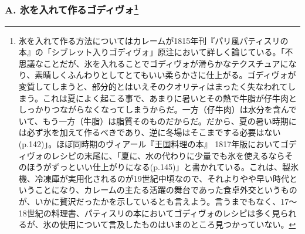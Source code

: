  
\begin{recette}
\hypertarget{godiveau-mouille-a-la-glace}{%
\subsubsection[A. 氷を入れて作るゴディヴォ]{\texorpdfstring{A.
氷を入れて作るゴディヴォ\footnote{氷を入れて作る方法についてはカレームが1815年刊『パリ風パティスリの本』の「シブレット入りゴディヴォ」原注において詳しく論じている。「不思議なことだが、氷を入れることでゴディヴォが滑らかなテクスチュアになり、素晴しくふんわりとしてとてもいい柔らかさに仕上がる。ゴディヴォが変質してしまうと、部分的とはいえそのクオリティはまったく失なわれてしまう。これは夏によく起こる事で、あまりに暑いとその熱で牛脂が仔牛肉としっかりつながらなくなってしまうからだ。一方（仔牛肉）は水分を含んでいて、もう一方（牛脂）は脂質そのものだからだ。だから、夏の暑い時期には必ず氷を加えて作るべきであり、逆に冬場はそこまでする必要はない(p.142)」。ほぼ同時期のヴィアール『王国料理の本』
  1817年版においてゴディヴォのレシピの末尾に、「夏に、水の代わりに少量でも氷を使えるならそのほうがずっといい仕上がりになる(p.145)」と書かれている。これは、製氷機、冷凍庫が実用化されるのが19世紀中頃なので、それよりやや早い時代ということになり、カレームの主たる活躍の舞台であった食卓外交というものが、いかに贅沢だったかを示しているとも言えよう。言うまでもなく、17〜18世紀の料理書、パティスリの本においてゴディヴォのレシピは多く見られるが、氷の使用について言及したものはいまのところ見つかっていない。}}{A. 氷を入れて作るゴディヴォ}}\label{godiveau-mouille-a-la-glace}}




\end{recette}
